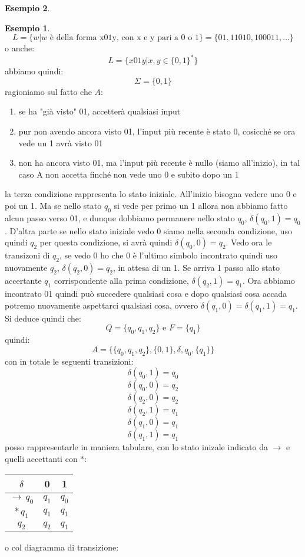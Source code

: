 \documentclass[a4paper]{book}
\theoremstyle{definition}%
\newtheorem*{esempio}{Esempio}
\begin{document}
\begin{esempio}
{\begin{esempio}
$$L=\{w|w \mbox{ è della forma x01y, con x e y pari a 0 o 1} \}=\{01,11010,100011,...\}$$
o anche:
$$L=\{x01y| x,y\in\{0,1\}^* \}$$
abbiamo quindi:
$$\Sigma=\{0,1\}$$
ragioniamo sul fatto che $A$:
\begin{enumerate}
\item se ha "già visto" 01, accetterà qualsiasi input
\item pur non avendo ancora visto 01, l'input più recente è stato 0, cosicché se ora vede un 1 avrà visto 01
\item non ha ancora visto 01, ma l'input più recente è nullo (siamo all'inizio), in tal caso A non accetta finché non vede
uno 0 e subito dopo un 1
\end{enumerate} 
la terza condizione rappresenta lo stato iniziale. All'inizio bisogna vedere uno 0 e poi un 1. Ma se nello stato $q_0$ si vede per primo un 1 allora non abbiamo fatto alcun passo verso 01, e dunque dobbiamo permanere nello stato $q_0$, $\delta(q_0,1)=q_0$. D'altra parte se nello stato iniziale vedo 0 siamo nella seconda condizione, uso quindi $q_2$ per questa condizione, si avrà quindi $\delta(q_0,0)=q_2$. Vedo ora le transizoni di $q_2$, se vedo 0 ho che 0 è l'ultimo simbolo incontrato quindi uso nuovamente $q_2$, $\delta(q_2,0)=q_2$, in attesa di un 1. Se arriva 1 passo allo stato accertante $q_1$ corrispondente alla prima condizione, $\delta(q_2,1)=q_1$. Ora abbiamo incontrato 01 quindi può succedere qualsiasi cosa e dopo qualsiasi cosa accada potremo nuovamente aspettarci qualsiasi cosa, ovvero $\delta(q_1,0)=\delta(q_1,1)=q_1$. Si deduce quindi che:
$$Q=\{q_0,q_1,q_2\} \mbox{ e } F=\{q_1\}$$
quindi:
$$A=\{\{q_0,q_1,q_2\} ,\{0,1\}, \delta, q_0, \{q_1\} \}$$
con in totale le seguenti transizioni:
$$\delta(q_0,1)=q_0$$
$$\delta(q_0,0)=q_2$$
$$\delta(q_2,0)=q_2$$
$$\delta(q_2,1)=q_1$$
$$\delta(q_1,0)=q_1$$
$$\delta(q_1,1)=q_1$$
posso rappresentarle in maniera tabulare, con lo stato inizale indicato da $\to$ e quelli accettanti con $*$:
\begin{center}
\begin{tabular}{c|c|c}
$\delta$ & 0 & 1 \\
\hline
$\to\,q_0$ & $q_1$ & $q_0$\\
\hline
$*\,q_1$ & $q_1$ & $q_1$\\
\hline
$q_2$ & $q_2$ & $q_1$
\end{tabular}
\end{center}
o col diagramma di transizione:
\begin{center}


\end{center}
\end{esempio}}
\end{esempio}
\end{document}
